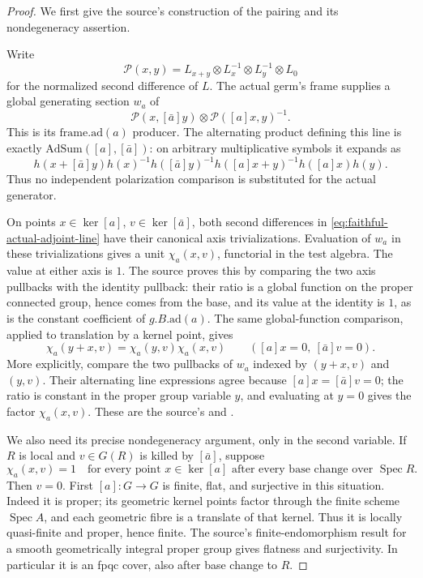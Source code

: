 \begin{proof}
We first give the source's construction of the pairing and its
nondegeneracy assertion.

Write
\[
 \mathcal P(x,y)=L_{x+y}\otimes L_x^{-1}\otimes L_y^{-1}\otimes L_0
\]
for the normalized second difference of \(L\).
The actual germ's frame supplies a global generating section \(w_a\)
of
\[
       \mathcal P(x,[\bar a]y)\otimes
                         \mathcal P([a]x,y)^{-1}.
 \tag{KG3}\label{eq:faithful-actual-adjoint-line}
\]
This is its \(\mathrm{frame.ad}(a)\) producer.
The alternating product defining this line is exactly
\(\mathrm{AdSum}([a],[\bar a])\): on arbitrary multiplicative
symbols it expands as
\[
 h(x+[\bar a]y)h(x)^{-1}h([\bar a]y)^{-1}
      h([a]x+y)^{-1}h([a]x)h(y).
\]
Thus no independent polarization comparison is substituted for
the actual generator.

On points \(x\in\ker[a]\), \(v\in\ker[\bar a]\), both second
differences in \eqref{eq:faithful-actual-adjoint-line} have their
canonical axis trivializations.  Evaluation of \(w_a\) in these
trivializations gives a unit \(\chi_a(x,v)\), functorial in the
test algebra.  The value at either axis is \(1\).
The source proves this by comparing the two axis pullbacks with
the identity pullback: their ratio is a global function on the
proper connected group, hence comes from the base, and its value
at the identity is \(1\), as is the constant coefficient of
\(g.B.\mathrm{ad}(a)\).
The same global-function comparison, applied to translation by a
kernel point, gives
\[
 \chi_a(y+x,v)=\chi_a(y,v)\chi_a(x,v)
              \qquad([a]x=0,\ [\bar a]v=0).
 \tag{KG4}\label{eq:faithful-kernel-character-law}
\]
More explicitly, compare the two pullbacks of \(w_a\) indexed by
\((y+x,v)\) and \((y,v)\).  Their alternating line expressions
agree because \([a]x=[\bar a]v=0\); the ratio is constant in the
proper group variable \(y\), and evaluating at \(y=0\) gives the
factor \(\chi_a(x,v)\).  These are the source's
 and .

We also need its precise nondegeneracy argument, only in the
second variable.  If \(R\) is local and \(v\in G(R)\) is killed by
\([\bar a]\), suppose
\[
      \chi_a(x,v)=1
 \quad\text{for every point }x\in\ker[a]
 \text{ after every base change over }\operatorname{Spec}R.
 \tag{KG5}\label{eq:faithful-kernel-pair-trivial}
\]
Then \(v=0\).
First \([a]:G\to G\) is finite, flat, and surjective in this
situation.  Indeed it is proper; its geometric kernel points
factor through the finite scheme \(\operatorname{Spec}A\), and
each geometric fibre is a translate of that kernel.  Thus it is
locally quasi-finite and proper, hence finite.  The source's
finite-endomorphism result for a smooth geometrically integral
proper group gives flatness and surjectivity.  In particular it
is an fpqc cover, also after base change to \(R\).


\end{proof}
